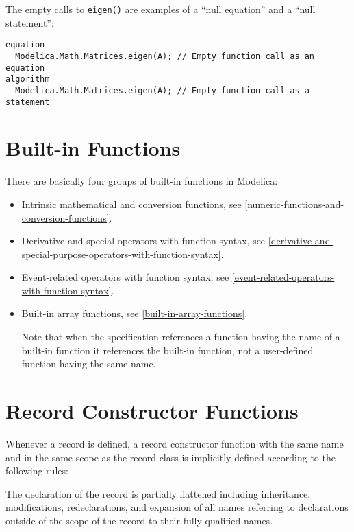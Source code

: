 \begin{example}
The empty calls to \lstinline!eigen()! are examples of a ``null equation'' and a ``null statement'':
\begin{lstlisting}[language=modelica]
equation
  Modelica.Math.Matrices.eigen(A); // Empty function call as an equation
algorithm
  Modelica.Math.Matrices.eigen(A); // Empty function call as a statement
\end{lstlisting}
\end{example}

\section{Built-in Functions}\label{built-in-functions}

There are basically four groups of built-in functions in Modelica:
\begin{itemize}
\item
  Intrinsic mathematical and conversion functions, see \cref{numeric-functions-and-conversion-functions}.
\item
  Derivative and special operators with function syntax,
  see \cref{derivative-and-special-purpose-operators-with-function-syntax}.
\item
  Event-related operators with function syntax, see \cref{event-related-operators-with-function-syntax}.
\item
  Built-in array functions, see \cref{built-in-array-functions}.

  Note that when the specification references a function having the name
  of a built-in function it references the built-in function, not a
  user-defined function having the same name.
\end{itemize}

\section{Record Constructor Functions}\label{record-constructor-functions}

Whenever a record is defined, a record constructor function with the
same name and in the same scope as the record class is implicitly
defined according to the following rules:

The declaration of the record is partially flattened including
inheritance, modifications, redeclarations, and expansion of all names
referring to declarations outside of the scope of the record to their
fully qualified names.

